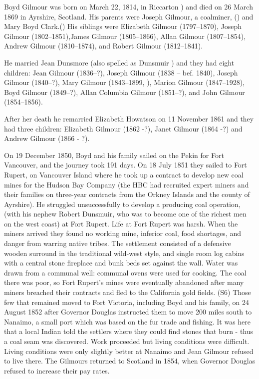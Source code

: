 
Boyd Gilmour was born on March 22, 1814, in Riccarton \cite{BGbirth}) and died on 26 March 1869 in Ayrshire, Scotland. His parents were Joseph Gilmour, a coalminer, () and Mary Boyd Clark.() His siblings were Elizabeth Gilmour (1797--1870), Joseph Gilmour (1802--1851),James Gilmour (1805--1866), Allan Gilmour (1807--1854), Andrew Gilmour (1810--1874), and Robert Gilmour (1812--1841).

He married Jean Dunsmore (also spelled as Dunsmuir ) and they had eight children:  Jean Gilmour (1836--?), Joseph Gilmour (1838 -- bef. 1840), Joseph Gilmour (1840--?), Mary Gilmour (1843--1899, ), Marion Gilmour (1847--1928), Boyd Gilmour (1849--?), Allan Columbia Gilmour (1851--?), and John Gilmour (1854--1856).

After her death he remarried Elizabeth Howatson on 11 November 1861 and they had three children: Elizabeth Gilmour (1862 -?), Janet Gilmour (1864 -?) and Andrew Gilmour (1866 - ?).

On 19 December 1850, Boyd and his family sailed on the Pekin for Fort Vancouver, and the journey took 191 days. On 18 July 1851 they sailed to Fort Rupert, on Vancouver Island where he took up a contract to develop new coal mines for the Hudson Bay Company (the HBC had recruited expert miners and their families on three-year contracts from the Orkney Islands and the county of Ayrshire). He struggled unsuccessfully to develop a producing coal operation, (with his nephew Robert Dunsmuir, who was to become one of the richest men on the west coast) at Fort Rupert. Life at Fort Rupert was harsh. When the miners arrived they found no working mine, inferior coal, food shortages, and danger from warring native tribes. The settlement consisted of a defensive wooden surround in the traditional wild-west style, and single room log cabins with a central stone fireplace and bunk beds set against the wall. Water was drawn from a communal well: communal ovens were used for cooking. The coal there was poor, so Fort Rupert’s mines were eventually abandoned after many miners breached their contracts and fled to the California gold fields. (S6) Those few that remained moved to Fort Victoria, including Boyd and his family, on 24 August 1852 after Governor Douglas instructed them to move 200 miles south to Nanaimo, a small port which was based on the fur trade and fishing. It was here that a local Indian told the settlers where they could find stones that burn - thus a coal seam was discovered. Work proceeded but living conditions were difficult. Living conditions were only slightly better at Nanaimo and Jean Gilmour refused to live there. The Gilmours returned to Scotland in 1854, when Governor Douglas refused to increase their pay rates. \cite{BGilmourCanada}

